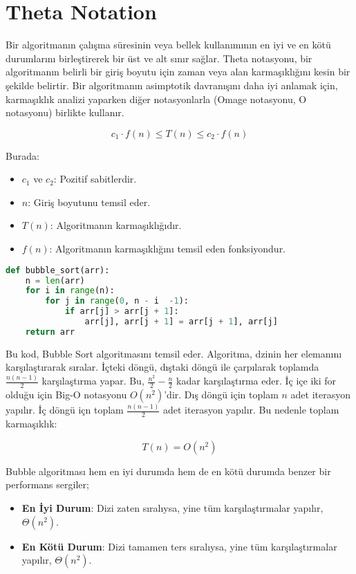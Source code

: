 \section{Theta Notation}

Bir algoritmanın çalışma süresinin veya bellek kullanımının en iyi ve en kötü durumlarını birleştirerek bir üst ve alt sınır sağlar. Theta notasyonu, bir algoritmanın belirli bir giriş boyutu için zaman veya alan karmaşıklığını kesin bir şekilde belirtir. Bir algoritmanın asimptotik davranışını daha iyi anlamak için, karmaşıklık analizi yaparken diğer notasyonlarla (Omage notasyonu, O notasyonu) birlikte kullanır.

\[ c_1 \cdot f(n) \leq T(n) \leq c_2 \cdot f(n) \]

Burada:

\begin{itemize}
    \item $c_1$ ve $c_2$: Pozitif sabitlerdir.
    \item $n$: Giriş boyutunu temsil eder.
    \item $T(n)$: Algoritmanın karmaşıklığıdır.
    \item $f(n)$: Algoritmanın karmaşıklığını temsil eden fonksiyondur.
\end{itemize}

\begin{lstlisting}[language=Python]
def bubble_sort(arr):
    n = len(arr)
    for i in range(n):
        for j in range(0, n - i  -1):
            if arr[j] > arr[j + 1]:
                arr[j], arr[j + 1] = arr[j + 1], arr[j]
    return arr
\end{lstlisting}

Bu kod, Bubble Sort algoritmasını temsil eder. Algoritma, dzinin her elemanını karşılaştırarak sıralar. İçteki döngü, dıştaki döngü ile çarpılarak toplamda $\frac{n(n-1)}{2}$ karşılaştırma yapar. Bu, $\frac{n^2}{2} - \frac{n}{2}$ kadar karşılaştırma eder. İç içe iki for olduğu için Big-O notasyonu $O(n^2)$'dir. Dış döngü için toplam $n$ adet iterasyon yapılır. İç döngü içn toplam $\frac{n(n-1)}{2}$ adet iterasyon yapılır. Bu nedenle toplam karmaşıklık:

\[ T(n) = O(n^2) \]

Bubble algoritması hem en iyi durumda hem de en kötü durumda benzer bir performans sergiler;

\begin{itemize}
    \item \textbf{En İyi Durum}: Dizi zaten sıralıysa, yine tüm karşılaştırmalar yapılır, $\Theta(n^2)$.
    \item \textbf{En Kötü Durum}: Dizi tamamen ters sıralıysa, yine tüm karşılaştırmalar yapılır, $\Theta(n^2)$.
\end{itemize}

\newpage
